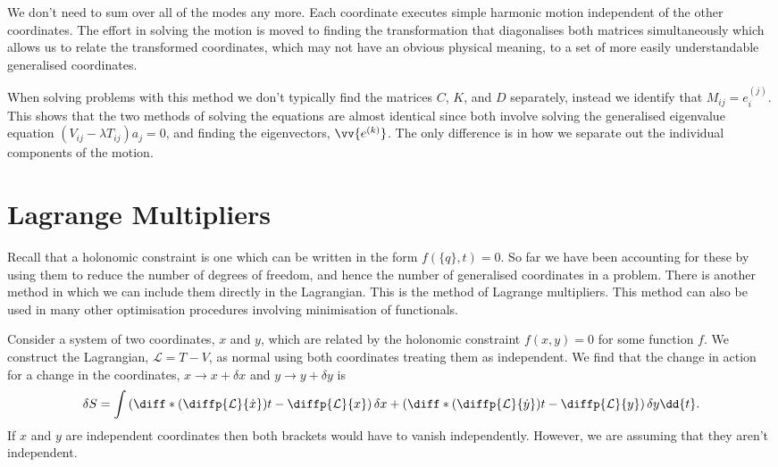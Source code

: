 \documentclass[fleqn]{NotesClass}
\newcommand*{\lagrangian}{\mathcal{L}}
\begin{document}
    We don't need to sum over all of the modes any more.
    Each coordinate executes simple harmonic motion independent of the other coordinates.
    The effort in solving the motion is moved to finding the transformation that diagonalises both matrices simultaneously which allows us to relate the transformed coordinates, which may not have an obvious physical meaning, to a set of more easily understandable generalised coordinates.
    
    When solving problems with this method we don't typically find the matrices \(C\), \(K\), and \(D\) separately, instead we identify that \(M_{ij} = e_i^{(j)}\).
    This shows that the two methods of solving the equations are almost identical since both involve solving the generalised eigenvalue equation \((V_{ij} - \lambda T_{ij})a_j = 0\), and finding the eigenvectors, \(\vv{e^{(k)}}\).
    The only difference is in how we separate out the individual components of the motion.
    
    \chapter{Lagrange Multipliers}\label{chap:lagrange multipliers}
    Recall that a holonomic constraint is one which can be written in the form \(f(\{q\}, t) = 0\).
    So far we have been accounting for these by using them to reduce the number of degrees of freedom, and hence the number of generalised coordinates in a problem.
    There is another method in which we can include them directly in the Lagrangian.
    This is the method of Lagrange multipliers.
    This method can also be used in many other optimisation procedures involving minimisation of functionals.
    
    Consider a system of two coordinates, \(x\) and \(y\), which are related by the holonomic constraint \(f(x, y) = 0\) for some function \(f\).
    We construct the Lagrangian, \(\lagrangian = T - V\), as normal using both coordinates treating them as independent.
    We find that the change in action for a change in the coordinates, \(x \to x + \delta x\) and \(y \to y + \delta y\) is
    \begin{equation}
        \delta S = \int \left( \diff*{\left( \diffp{\lagrangian}{\dot{x}} \right)}{t} - \diffp{\lagrangian}{x} \right)\delta x + \left( \diff*{\left( \diffp{\lagrangian}{\dot{y}} \right)}{t} - \diffp{\lagrangian}{y} \right)\delta y \dd{t}.
    \end{equation}
    If \(x\) and \(y\) are independent coordinates then both brackets would have to vanish independently.
    However, we are assuming that they aren't independent.
    
\end{document}
